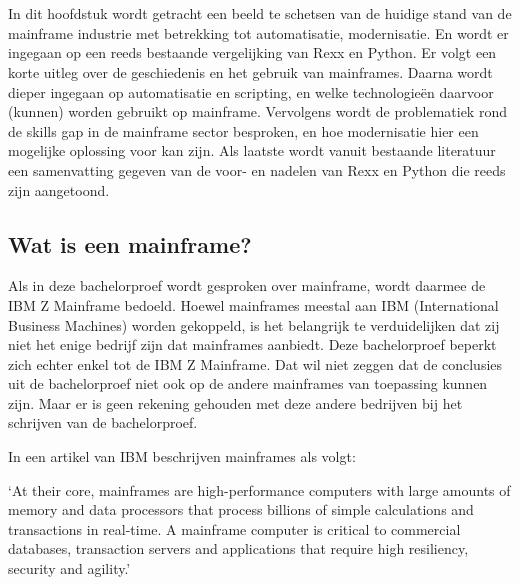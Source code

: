 \chapter{}%
\label{ch:stand-van-zaken}




In dit hoofdstuk wordt getracht een beeld te schetsen van de huidige stand van de mainframe industrie met betrekking tot automatisatie, modernisatie. En wordt er ingegaan op een reeds bestaande vergelijking van Rexx en Python. Er volgt een korte uitleg over de geschiedenis en het gebruik van mainframes. Daarna wordt dieper ingegaan op automatisatie en scripting, en welke technologieën daarvoor (kunnen) worden gebruikt op mainframe. Vervolgens wordt de problematiek rond de skills gap in de mainframe sector besproken, en hoe modernisatie hier een mogelijke oplossing voor kan zijn. Als laatste wordt vanuit bestaande literatuur een samenvatting gegeven van de voor- en nadelen van Rexx en Python die reeds zijn aangetoond.

\section{Wat is een mainframe?}

Als in deze bachelorproef wordt gesproken over mainframe, wordt daarmee de IBM Z Mainframe bedoeld. Hoewel mainframes meestal aan IBM (International Business Machines) worden gekoppeld, is het belangrijk te verduidelijken dat zij niet het enige bedrijf zijn dat mainframes aanbiedt. Deze bachelorproef beperkt zich echter enkel tot de IBM Z Mainframe. Dat wil niet zeggen dat de conclusies uit de bachelorproef niet ook op de andere mainframes van toepassing kunnen zijn. Maar er is geen rekening gehouden met deze andere bedrijven bij het schrijven van de bachelorproef.

In een artikel van IBM beschrijven \textcite{Susnjara2024} mainframes als volgt:

`At their core, mainframes are high-performance computers with large amounts of memory and data processors that process billions of simple calculations and transactions in real-time. A mainframe computer is critical to commercial databases, transaction servers and applications that require high resiliency, security and agility.'

